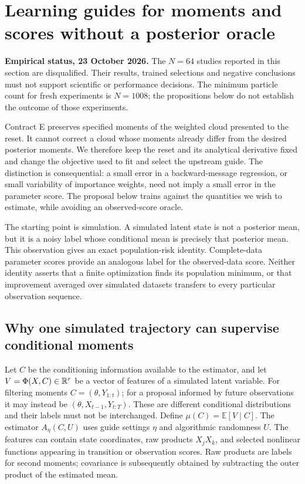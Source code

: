 \section{Learning guides for moments and scores without a posterior oracle}
\label{sec:supervised-guidance}

\noindent\textbf{Empirical status, 23 October 2026.}
The $N=64$ studies reported in this section are disqualified. Their results,
trained selections and negative conclusions must not support scientific or
performance decisions. The minimum particle count for fresh experiments is
$N=1008$; the propositions below do not establish the outcome of those experiments.

Contract E preserves specified moments of the weighted cloud presented to the
reset. It cannot correct a cloud whose moments already differ from the desired
posterior moments. We therefore keep the reset and its analytical derivative
fixed and change the objective used to fit and select the upstream guide.
The distinction is consequential: a small error in a backward-message
regression, or small variability of importance weights, need not imply a
small error in the parameter score. The proposal below trains against the
quantities we wish to estimate, while avoiding an observed-score oracle.

The starting point is simulation. A simulated latent state is not a posterior
mean, but it is a noisy label whose conditional mean is precisely that
posterior mean. This observation gives an exact population-risk identity.
Complete-data parameter scores provide an analogous label for the observed-data
score. Neither identity asserts that a finite optimization finds its population
minimum, or that improvement averaged over simulated datasets transfers to
every particular observation sequence.

\subsection{Why one simulated trajectory can supervise conditional moments}

Let $C$ be the conditioning information available to the estimator, and let
$V=\Phi(X,C)\in\mathbb{R}^r$ be a vector of features of a simulated latent variable.
For filtering moments $C=(\theta,Y_{1:t})$; for a proposal informed by future
observations it may instead be $(\theta,X_{t-1},Y_{t:T})$. These are different
conditional distributions and their labels must not be interchanged. Define
$\mu(C)=\mathbb E[V\mid C]$. The estimator
$A_\eta(C,U)$ uses guide settings $\eta$ and algorithmic randomness $U$.
The features can contain state coordinates, raw products $X_jX_k$, and
selected nonlinear functions appearing in transition or observation scores.
Raw products are labels for second moments; covariance is subsequently
obtained by subtracting the outer product of the estimated mean.

